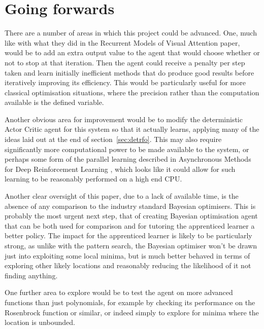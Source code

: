 \section{Going forwards}
There are a number of areas in which this project could be advanced. One, much like with what they did in the Recurrent Models of Visual Attention paper\cite{RVA}, would be to add an extra output value to the agent that would choose whether or not to stop at that iteration. Then the agent could receive a penalty per step taken and learn initially inefficient methods that do produce good results before iteratively improving its efficiency. This would be particularly useful for more classical optimisation situations, where the precision rather than the computation available is the defined variable.

Another obvious area for improvement would be to modify the deterministic Actor Critic agent for this system so that it actually learns, applying many of the ideas laid out at the end of section~\ref{sec:detrfo}. This may also require significantly more computational power to be made available to the system, or perhaps some form of the parallel learning described in Asynchronous Methods for Deep Reinforcement Learning \cite{mnih2016asynchronous}, which looks like it could allow for such learning to be reasonably performed on a high end CPU.

Another clear oversight of this paper, due to a lack of available time, is the absence of any comparison to the industry standard Bayesian optimisers. This is probably the most urgent next step, that of creating Bayesian optimisation agent that can be both used for comparison and for tutoring the apprenticed learner a better policy. The impact for the apprenticed learner is likely to be particularly strong, as unlike with the pattern search, the Bayesian optimiser won't be drawn just into exploiting some local minima, but is much better behaved in terms of exploring other likely locations and reasonably reducing the likelihood of it not finding anything.

One further area to explore would be to test the agent on more advanced functions than just polynomials, for example by checking its performance on the Rosenbrock function or similar, or indeed simply to explore for minima where the location is unbounded.